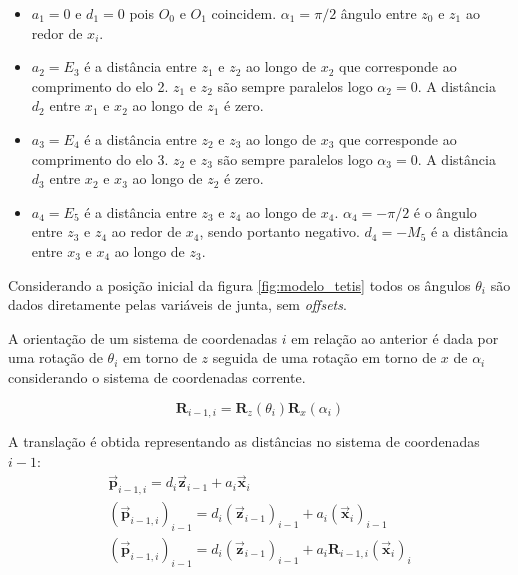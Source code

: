 \begin{itemize}
\item $a_1 = 0$  e $d_1 = 0$ pois $O_0$ e $O_1$ coincidem. $\alpha_1 = \pi/2$ ângulo entre $z_0$ e $z_1$ ao redor de $x_i$.
\item $a_2 = E_3$ é a distância entre $z_1$ e $z_2$ ao longo de $x_2$ que corresponde ao comprimento do elo 2. $z_1$ e $z_2$ são sempre paralelos logo $\alpha_2 = 0$. A distância $d_2$ entre $x_1$ e $x_2$ ao longo de $z_1$ é zero. 

\item $a_3 = E_4$ é a distância entre $z_2$ e $z_3$ ao longo de $x_3$ que corresponde ao comprimento do elo 3. $z_2$ e $z_3$ são sempre paralelos logo $\alpha_3 = 0$. A distância $d_3$ entre $x_2$ e $x_3$ ao longo de $z_2$ é zero. 

\item $a_4 = E_5$ é a distância entre $z_3$ e $z_4$ ao longo de $x_4$. $\alpha_4 = -\pi/2$ é o ângulo entre $z_3$ e $z_4$ ao redor de $x_4$, sendo portanto negativo. $d_4 = -M_5$ é a distância entre $x_3$ e $x_4$ ao longo de $z_3$. 
\end{itemize}

Considerando a posição inicial da figura \ref{fig:modelo_tetis} todos os ângulos $\theta_i$ são dados diretamente pelas variáveis de junta, sem \textit{offsets}. 

A orientação de um sistema de coordenadas $i$ em relação ao anterior é dada por uma rotação de $\theta_i$ em torno de $z$ seguida de uma rotação em torno de $x$ de $\alpha_i$ considerando o sistema de coordenadas corrente.

\begin{equation}
\bm{R}_{i-1,i} = \bm{R}_z(\theta_i)\bm{R}_x(\alpha_i)
\end{equation}

A translação é obtida representando as distâncias no sistema de coordenadas $i-1$:
\begin{gather}
\bm{\vec{p}}_{i-1,i} = d_i \bm{\vec{z}}_{i-1} + a_i \bm{\vec{x}}_i \\
(\bm{\vec{p}}_{i-1,i})_{i-1} = d_i (\bm{\vec{z}}_{i-1})_{i-1} + a_i (\bm{\vec{x}}_i)_{i-1} \\
(\bm{\vec{p}}_{i-1,i})_{i-1} = d_i (\bm{\vec{z}}_{i-1})_{i-1} + a_i \bm{R}_{i-1,i}(\bm{\vec{x}}_i)_{i} 
\end{gather}

